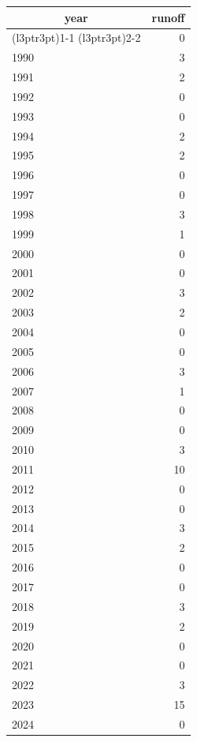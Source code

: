 \footnotesize\begin{tabular}[t]{lr}
\toprule
\multicolumn{1}{c}{year} & \multicolumn{1}{c}{runoff} \\
\cmidrule(l{3pt}r{3pt}){1-1} \cmidrule(l{3pt}r{3pt}){2-2}
  & 0\\
\midrule
1990 & 3\\
1991 & 2\\
1992 & 0\\
1993 & 0\\
1994 & 2\\
1995 & 2\\
1996 & 0\\
1997 & 0\\
1998 & 3\\
1999 & 1\\
2000 & 0\\
2001 & 0\\
2002 & 3\\
2003 & 2\\
2004 & 0\\
2005 & 0\\
2006 & 3\\
2007 & 1\\
2008 & 0\\
2009 & 0\\
2010 & 3\\
2011 & 10\\
2012 & 0\\
2013 & 0\\
2014 & 3\\
2015 & 2\\
2016 & 0\\
2017 & 0\\
2018 & 3\\
2019 & 2\\
2020 & 0\\
2021 & 0\\
2022 & 3\\
2023 & 15\\
2024 & 0\\
\bottomrule
\end{tabular}

